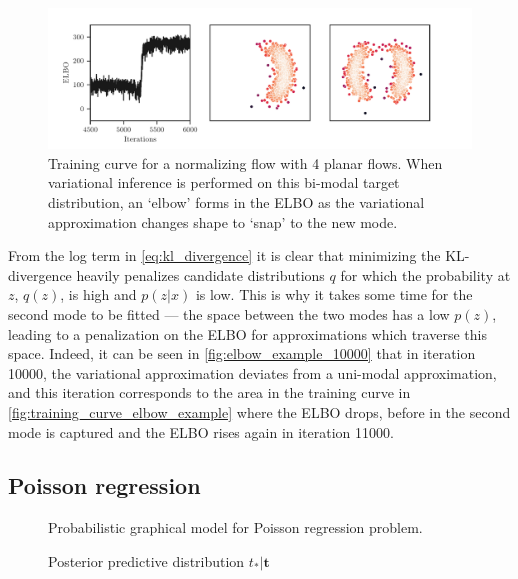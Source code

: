 \begin{figure}
    \begin{adjustwidth}{-2.5cm}{-2.5cm}
    \centering
     \includegraphics{figures/elbow_example/elbow.pdf}
    \caption{Training curve for a normalizing flow with 4 planar flows. When variational inference is performed on this bi-modal target distribution, an `elbow' forms in the ELBO as the variational approximation changes shape to `snap' to the new mode\cite{blei2017variational}.}
    \end{adjustwidth}
\end{figure}

From the log term in \cref{eq:kl_divergence} it is clear that minimizing the KL-divergence heavily penalizes candidate distributions $q$ for which the probability at $z$, $q(z)$, is high and $p(z|x)$ is low.
This is why it takes some time for the second mode to be fitted --- the space between the two modes has a low $p(z)$, leading to a penalization on the ELBO for approximations which traverse this space.
Indeed, it can be seen in \cref{fig:elbow_example_10000} that in iteration 10000, the variational approximation deviates from a uni-modal approximation, and this iteration corresponds to the area in the training curve in \cref{fig:training_curve_elbow_example} where the ELBO drops, before in the second mode is captured and the ELBO rises again in iteration 11000.

\subsection{Poisson regression}

\begin{figure}
    \centering
    \caption{Probabilistic graphical model for Poisson regression problem.}
    \label{fig:poisson-pgm}
\end{figure}

\begin{figure}
    \centering
    \caption{Posterior predictive distribution $t_{*}|\mathbf{t}$}
\end{figure}

